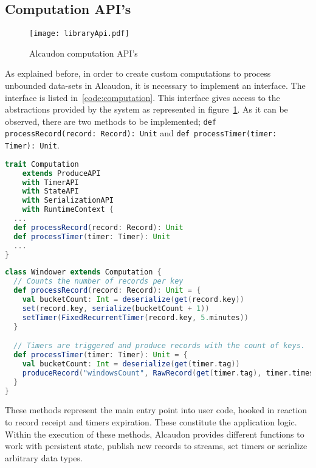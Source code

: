 \subsection{Computation API's}

\begin{figure}[!h]
  \begin{center}
  \texttt{[image: libraryApi.pdf]}
  \caption{Alcaudon computation API's}
  \label{fig:apis}
  \end{center}
\end{figure}

As explained before, in order to create custom computations to process unbounded
data-sets in Alcaudon, it is necessary to implement an interface. The interface
is listed in~\ref{code:computation}. This interface gives access to the
abstractions provided by the system as represented in figure~\ref{fig:apis}. As
it can be observed, there are two methods to be implemented;
\lstinline[columns=fixed]{def processRecord(record: Record): Unit} and \lstinline[columns=fixed]{def processTimer(timer: Timer): Unit}.

\begin{lstlisting}[language=scala, frame=trBL, label=code:computation, float=ht, caption = {Computation API's}]
trait Computation
    extends ProduceAPI
    with TimerAPI
    with StateAPI
    with SerializationAPI
    with RuntimeContext {
  ...
  def processRecord(record: Record): Unit
  def processTimer(timer: Timer): Unit
  ...
}
\end{lstlisting}

\begin{lstlisting}[language=scala, frame=trBL, label=code:computationExample, float=ht, caption = {Computation example}]
class Windower extends Computation {
  // Counts the number of records per key
  def processRecord(record: Record): Unit = {
    val bucketCount: Int = deserialize(get(record.key))
    set(record.key, serialize(bucketCount + 1))
    setTimer(FixedRecurrentTimer(record.key, 5.minutes))
  }

  // Timers are triggered and produce records with the count of keys.
  def processTimer(timer: Timer): Unit = {
    val bucketCount: Int = deserialize(get(timer.tag))
    produceRecord("windowsCount", RawRecord(get(timer.tag), timer.timestamp))
  }
}
\end{lstlisting}

These methods represent the main entry point into user code, hooked in reaction to
record receipt and timers expiration. These constitute the application logic.
Within the execution of these methods, Alcaudon provides different functions to
work with persistent state, publish new records to streams, set timers or
serialize arbitrary data types.

